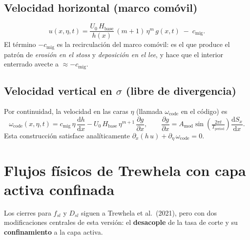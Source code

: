\documentclass[11pt,a4paper]{article}
\newcommand{\dd}{\mathrm{d}}
\newcommand{\pd}[2]{\dfrac{\partial #1}{\partial #2}}
\begin{document}
\subsection{Velocidad horizontal (marco comóvil)}
\begin{equation}
    u(x,\eta,t) = \frac{U_0\,H_{\mathrm{base}}}{h(x)}\,(m+1)\,\eta^{m}\,g(x,t)\;-\;c_{\mathrm{mig}}.
    \label{eq:u}
\end{equation}
El término $-c_{\mathrm{mig}}$ es la recirculación del marco comóvil:
es el que produce el patrón de \emph{erosión en el stoss} y
\emph{deposición en el lee}, y hace que el interior enterrado avecte a
$\approx -c_{\mathrm{mig}}$.
\subsection{Velocidad vertical en $\sigma$ (libre de divergencia)}
Por continuidad, la velocidad en las caras $\eta$ (llamada
$\omega_{\mathrm{code}}$ en el código) es
\begin{equation}
    \omega_{\mathrm{code}}(x,\eta,t)
    = c_{\mathrm{mig}}\,\eta\,\frac{\dd h}{\dd x}
    - U_0\,H_{\mathrm{base}}\,\eta^{m+1}\,\pd{g}{x},
    \qquad
    \pd{g}{x} = A_{\mathrm{mod}}\sin\!\left(\tfrac{2\pi t}{T_{\mathrm{period}}}\right)\frac{\dd S_x}{\dd x}.
    \label{eq:wcode}
\end{equation}
Esta construcción satisface analíticamente
$\partial_x(h\,u) + \partial_\eta\,\omega_{\mathrm{code}} = 0$.

\section{Flujos físicos de Trewhela con capa activa confinada}
\label{sec:trewhela}
\label{sec:confin}
Los cierres para $f_{sl}$ y $D_{sl}$ siguen a Trewhela et al.\ (2021), pero
con dos modificaciones centrales de esta versión: el \textbf{desacople} de
la tasa de corte y su \textbf{confinamiento} a la capa activa.
\end{document}
